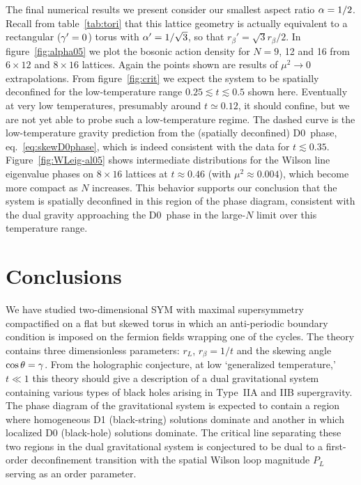 The final numerical results we present consider our smallest aspect ratio $\alpha = 1 / 2$.
Recall from table~\ref{tab:tori} that this lattice geometry is actually equivalent to a rectangular ($\gamma' = 0$) torus with $\alpha' = 1 / \sqrt{3}$, so that $r_{\beta}' = \sqrt{3} r_{\beta} / 2$.
In figure~\ref{fig:alpha05} we plot the bosonic action density for $N = 9$, 12 and 16 from $6\times 12$ and $8\times 16$ lattices.
Again the points shown are results of $\mu^2 \to 0$ extrapolations.
From figure~\ref{fig:crit} we expect the system to be spatially deconfined for the low-temperature range $0.25 \lesssim t \lesssim 0.5$ shown here.
Eventually at very low temperatures, presumably around $t \simeq 0.12$, it should confine, but we are not yet able to probe such a low-temperature regime.
The dashed curve is the low-temperature gravity prediction from the (spatially deconfined) D0~phase, eq.~\eqref{eq:skewD0phase}, which is indeed consistent with the data for $t \lesssim 0.35$.
Figure~\ref{fig:WLeig-al05} shows intermediate distributions for the Wilson line eigenvalue phases on $8\times 16$ lattices at $t \approx 0.46$ (with $\mu^2 \approx 0.004$), which become more compact as $N$ increases.
This behavior supports our conclusion that the system is spatially deconfined in this region of the phase diagram, consistent with the dual gravity approaching the D0~phase in the large-$N$ limit over this temperature range.

\section{Conclusions}
We have studied two-dimensional SYM with maximal supersymmetry compactified on a flat but skewed torus in which an anti-periodic boundary condition is imposed on the fermion fields wrapping one of the cycles.
The theory contains three dimensionless parameters: $r_L$, $r_{\beta} = 1 / t$ and the skewing angle $\cos\theta = \gamma$.
From the holographic conjecture, at low `generalized temperature,' $t \ll 1$ this theory should give a description of a dual gravitational system containing various types of black holes arising in Type~IIA and IIB supergravity.
The phase diagram of the gravitational system is expected to contain a region where homogeneous D1 (black-string) solutions dominate and another in which localized D0 (black-hole) solutions dominate.
The critical line separating these two regions in the dual gravitational system is conjectured to be dual to a first-order deconfinement transition with the spatial Wilson loop magnitude $P_L$ serving as an order parameter.

